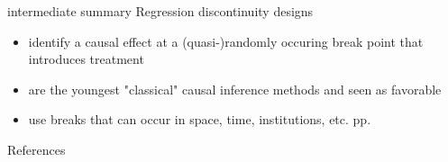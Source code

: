 \documentclass[aspectratio=169]{beamer}
\begin{document}
		\begin{frame}{intermediate summary}
			Regression discontinuity designs \\ \vspace*{.5cm}
			\begin{itemize}
				\item identify a causal effect at a (quasi-)randomly occuring break point that introduces treatment
				\item are the youngest "classical" causal inference methods and seen as favorable
				\item use breaks that can occur in space, time, institutions, etc. pp.
			\end{itemize}
		\end{frame}

	\begin{frame}[t, allowframebreaks]{References}
	  \printbibliography
	\end{frame}
\end{document}

